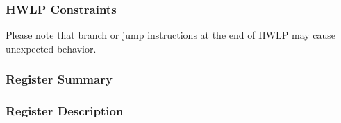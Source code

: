 \documentclass[main\_\_EN.tex]{subfiles}
\begin{document}
\subsubsection{HWLP Constraints}
\label{sec:riscvcpu-hwloop-constraints}

Please note that branch or jump instructions at the end of HWLP may cause unexpected behavior.

\subsubsection{Register Summary}
\label{sec:riscvcpu-hwloop-reg-summ}



\subsubsection{Register Description}
\label{sec:riscvcpu-hwloop-reg-desc}

\end{document}
